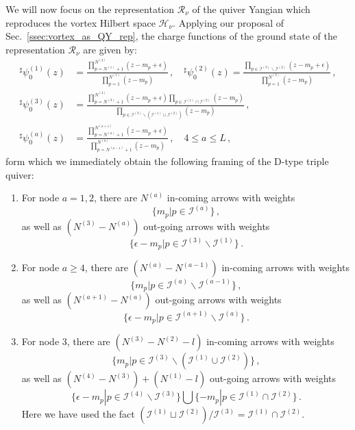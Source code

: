 \documentclass[12pt,a4paper]{article}
\renewcommand{\(}{\left(}
\renewcommand{\)}{\right)}
\renewcommand{\(}{\left(}
\renewcommand{\)}{\right)}
\begin{document}
We will now focus on the representation $\mathcal{R}_\nu$ of the quiver Yangian which reproduces the vortex Hilbert space $\mathcal{H}_\nu$. 
Applying our proposal of Sec.~\ref{ssec:vortex_as_QY_rep}, the charge functions of the ground state of the representation $\mathcal{R}_\nu$ are given by:
\begin{equation}\label{eq:D_ground_charge}
\begin{aligned}
^\sharp\psi^{(1)}_0(z)&=\frac{\prod_{p=N^{(1)}+1}^{N^{(3)}}(z-m_p+\epsilon)}{\prod_{p=1}^{N^{(1)}}(z-m_p)}\,,\quad ^\sharp\psi^{(2)}_0(z)=\frac{\prod_{p\in \mathcal{I}^{(3)}\backslash\mathcal{I}^{(2)}}(z-m_p+\epsilon)}{\prod_{p=1}^{N^{(2)}}(z-m_p)}\,,\\
^\sharp\psi^{(3)}_0(z)&=\frac{\prod_{p=N^{(3)}+1}^{N^{(4)}}(z-m_p+\epsilon)\prod_{p\in \mathcal{I}^{(1)}\cap \mathcal{I}^{(2)}}(z-m_p)}{\prod_{p\in \mathcal{I}^{(3)}\backslash(\mathcal{I}^{(1)}\cup \mathcal{I}^{(2)})}(z-m_p)}\,,\\
^\sharp\psi^{(a)}_0(z)&=\frac{\prod_{p=N^{(a)}+1}^{N^{(a+1)}}(z-m_p+\epsilon)}{\prod_{p=N^{(a-1)}+1}^{N^{(a)}}(z-m_p)}\,,\quad 4\leq a\leq L\,,
\end{aligned}
\end{equation}
form which we immediately obtain the following framing of the D-type triple quiver:
\begin{enumerate}
\item For node $a=1,2$, there are $N^{(a)}$ in-coming arrows with weights 
\begin{equation} \label{eq:Dtype_framing_first}
\{m_p|p\in \mathcal{I}^{(a)}\}\,,\end{equation}
as well as $(N^{(3)}-N^{(a)})$ out-going arrows with weights
\begin{equation}\{\epsilon-m_p|p\in\mathcal{I}^{(3)}\backslash \mathcal{I}^{(1)}\}\,.\end{equation}

\item For node $a\geq4$, there are $(N^{(a)}-N^{(a-1)})$ in-coming arrows with weights
\begin{equation}\{m_p|p\in\mathcal{I}^{(a)}\backslash \mathcal{I}^{(a-1)}\}\,,\end{equation}
as well as $(N^{(a+1)}-N^{(a)})$ out-going arrows with weights
\begin{equation}\{\epsilon-m_p|p\in\mathcal{I}^{(a+1)}\backslash \mathcal{I}^{(a)}\}\,.\end{equation}

\item For node 3, there are $(N^{(3)}-N^{(2)}-l)$ in-coming arrows with weights
\begin{equation}\{m_p|p\in \mathcal{I}^{(3)}\backslash (\mathcal{I}^{(1)}\cup\mathcal{I}^{(2)})\}\,,\end{equation}
as well as $(N^{(4)}-N^{(3)})+(N^{(1)}-l)$ out-going arrows with weights
\begin{equation}\label{eq:Dtype_framing_last}
\{\epsilon-m_p|p\in \mathcal{I}^{(4)}\backslash \mathcal{I}^{(3)}\}\bigcup\{-m_p|p\in \mathcal{I}^{(1)}\cap\mathcal{I}^{(2)}\}\,.
\end{equation}
Here we have used the fact $(\mathcal{I}^{(1)}\sqcup\mathcal{I}^{(2)})/\mathcal{I}^{(3)}=\mathcal{I}^{(1)}\cap\mathcal{I}^{(2)}$.
\end{enumerate} 
\end{document}
